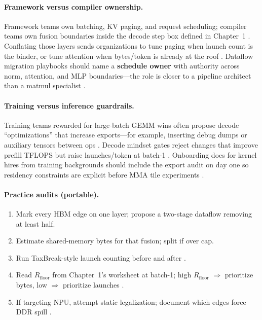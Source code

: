 \paragraph{Framework versus compiler ownership.}
Framework teams own batching, KV paging, and request scheduling; compiler teams own fusion boundaries inside the decode step box defined in Chapter~1 \citep{kwon2023vllm,yirage2026}.
Conflating those layers sends organizations to tune paging when launch count is the binder, or tune attention when bytes/token is already at the roof \citep{memoryfloor2026}.
Dataflow migration playbooks should name a \textbf{schedule owner} with authority across norm, attention, and MLP boundaries---the role is closer to a pipeline architect than a matmul specialist \citep{patel2025llminference}.

\paragraph{Training versus inference guardrails.}
Training teams rewarded for large-batch GEMM wins often propose decode ``optimizations'' that increase exports---for example, inserting debug dumps or auxiliary tensors between ops \citep{dlbook}.
Decode mindset gates reject changes that improve prefill TFLOPS but raise launches/token at batch-1 \citep{taxbreak2026}.
Onboarding docs for kernel hires from training backgrounds should include the export audit on day one so residency constraints are explicit before MMA tile experiments \citep{patel2025llminference}.

\paragraph{Practice audits (portable).}
\begin{enumerate}
\item Mark every HBM edge on one layer; propose a two-stage dataflow removing at least half.
\item Estimate shared-memory bytes for that fusion; split if over cap.
\item Run TaxBreak-style launch counting before and after \citep{taxbreak2026}.
\item Read $R_{\mathrm{floor}}$ from Chapter~1's worksheet at batch-1; high $R_{\mathrm{floor}}$ $\Rightarrow$ prioritize bytes, low $\Rightarrow$ prioritize launches \citep{memoryfloor2026}.
\item If targeting NPU, attempt static legalization; document which edges force DDR spill \citep{amd2024xdna}.
\end{enumerate}

